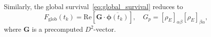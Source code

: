 \documentclass[12pt,a4paper]{article}
\begin{document}
Similarly, the global survival~\eqref{eq:global_survival} reduces to
\begin{equation}
  F_{\mathrm{glob}}(t_k) = \mathrm{Re}\!\left[\mathbf{G}\cdot
    \overline{\boldsymbol{\phi}(t_k)}\right],
  \quad
  G_p = [\rho_E]_{\alpha\beta}[\rho_E]_{\beta\alpha},
  \label{app:G}
\end{equation}
where $\mathbf{G}$ is a precomputed $D^2$-vector.


\end{document}
